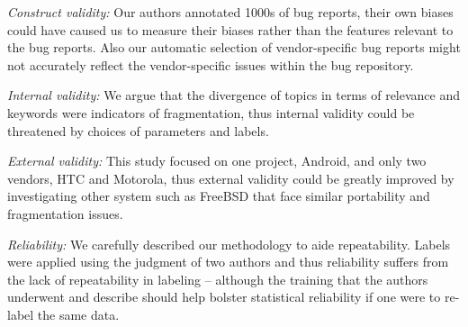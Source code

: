 \documentclass[10pt, conference, compsocconf]{IEEEtran}
\begin{document}
\textit{Construct validity:}  
Our authors annotated 1000s of bug reports, their own biases could
have caused us to measure their biases rather than the features
relevant to the bug reports.
Also our automatic selection of vendor-specific bug reports
might not accurately reflect the vendor-specific issues within the
bug repository.


\textit{Internal validity:}  We argue that the divergence of topics in
terms of relevance and keywords were indicators of fragmentation, thus
internal validity could be threatened by choices of parameters and labels.


\textit{External validity:}  This study focused on one project,
Android, and only two vendors, HTC and Motorola, thus external
validity could be greatly improved by investigating other system such
as FreeBSD that face similar portability and fragmentation issues.

\textit{Reliability:}  
We carefully described our methodology to aide repeatability.
Labels were applied using the judgment of two authors and
thus reliability suffers from the lack of repeatability in labeling --
although the training that the authors
underwent and describe should help bolster statistical reliability if one were to
re-label the same data.
\end{document}
